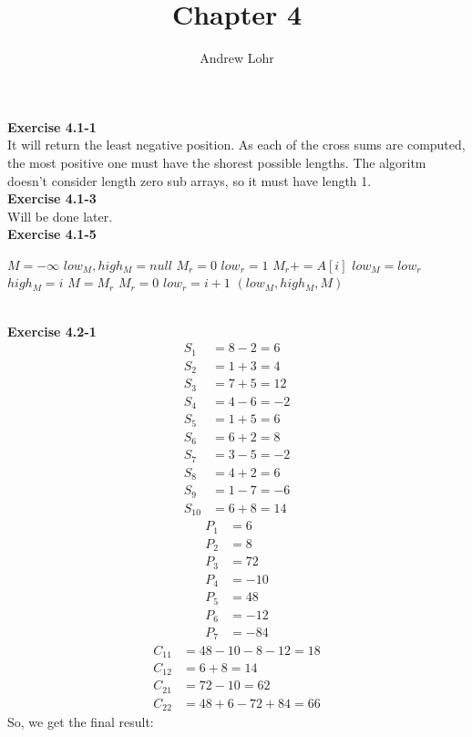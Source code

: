 \documentclass{article}
\title{Chapter 4}
\author{Andrew Lohr}
\begin{document}
\maketitle

\noindent\textbf{Exercise 4.1-1}\\
It will return the least negative position. As each of the cross sums are computed, the most positive one must have the shorest possible lengths. The algoritm doesn't consider length zero sub arrays, so it must have length 1.\\

\noindent\textbf{Exercise 4.1-3}\\
Will be done later. \\

\noindent\textbf{Exercise 4.1-5}\\
\begin{algorithm}
\begin{algorithmic}[1]
\State $M =-\infty$
\State $low_M, high_M = null$
\State $M_r = 0$
\State $low_r = 1$
\State $M_r += A[i]$
\State $low_M = low_r$
\State $high_M = i$
\State $M= M_r$
\EndIf
{}
\State $M_r = 0$
\State $low_r = i+1$
\EndIf
\State \Return $(low_M,high_M,M)$
\EndFor


\end{algorithmic}
\end{algorithm}\\

\noindent\textbf{Exercise 4.2-1}\\
\begin{align*}
S_1 &= 8-2=6\\
S_2 &= 1+3 = 4\\
S_3 &=7+5 = 12\\
S_4 &=4-6 = -2\\
S_5 &=1+5=6\\
S_6 &=6+2=8\\
S_7 &=3-5=-2\\
S_8 &=4 +2=6\\
S_9 &=1-7 = -6\\
S_{10} &=6+8=14
\end{align*}
\begin{align*}
P_1 &=6\\
P_2 &=8\\
P_3 &=72\\
P_4 &=-10\\
P_5 &=48\\
P_6 &=-12\\
P_7 &=-84
\end{align*}
\begin{align*}
C_{11} &=48 -10-8-12 = 18\\
C_{12} &= 6+8 = 14\\
C_{21} &= 72-10 = 62\\
C_{22} &=48+6-72+84 = 66
\end{align*}
So, we get the final result:
\end{document}
